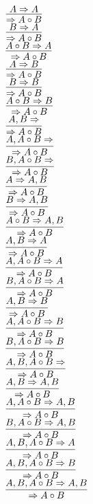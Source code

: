 \documentclass[11pt]{article}
\begin{document}
\begin{center}
\bigskip
\\$\infer{\Rightarrow A\circ B}{A\Rightarrow A}$
\bigskip
\\$\infer{\Rightarrow A\circ B}{B\Rightarrow A}$
\bigskip
\\$\infer{\Rightarrow A\circ B}{A\circ B\Rightarrow A}$
\bigskip
\\$\infer{\Rightarrow A\circ B}{A\Rightarrow B}$
\bigskip
\\$\infer{\Rightarrow A\circ B}{B\Rightarrow B}$
\bigskip
\\$\infer{\Rightarrow A\circ B}{A\circ B\Rightarrow B}$
\bigskip
\\$\infer{\Rightarrow A\circ B}{A, B\Rightarrow }$
\bigskip
\\$\infer{\Rightarrow A\circ B}{A, A\circ B\Rightarrow }$
\bigskip
\\$\infer{\Rightarrow A\circ B}{B, A\circ B\Rightarrow }$
\bigskip
\\$\infer{\Rightarrow A\circ B}{A\Rightarrow A, B}$
\bigskip
\\$\infer{\Rightarrow A\circ B}{B\Rightarrow A, B}$
\bigskip
\\$\infer{\Rightarrow A\circ B}{A\circ B\Rightarrow A, B}$
\bigskip
\\$\infer{\Rightarrow A\circ B}{A, B\Rightarrow A}$
\bigskip
\\$\infer{\Rightarrow A\circ B}{A, A\circ B\Rightarrow A}$
\bigskip
\\$\infer{\Rightarrow A\circ B}{B, A\circ B\Rightarrow A}$
\bigskip
\\$\infer{\Rightarrow A\circ B}{A, B\Rightarrow B}$
\bigskip
\\$\infer{\Rightarrow A\circ B}{A, A\circ B\Rightarrow B}$
\bigskip
\\$\infer{\Rightarrow A\circ B}{B, A\circ B\Rightarrow B}$
\bigskip
\\$\infer{\Rightarrow A\circ B}{A, B, A\circ B\Rightarrow }$
\bigskip
\\$\infer{\Rightarrow A\circ B}{A, B\Rightarrow A, B}$
\bigskip
\\$\infer{\Rightarrow A\circ B}{A, A\circ B\Rightarrow A, B}$
\bigskip
\\$\infer{\Rightarrow A\circ B}{B, A\circ B\Rightarrow A, B}$
\bigskip
\\$\infer{\Rightarrow A\circ B}{A, B, A\circ B\Rightarrow A}$
\bigskip
\\$\infer{\Rightarrow A\circ B}{A, B, A\circ B\Rightarrow B}$
\bigskip
\\$\infer{\Rightarrow A\circ B}{A, B, A\circ B\Rightarrow A, B}$

\end{center}
\end{document}
